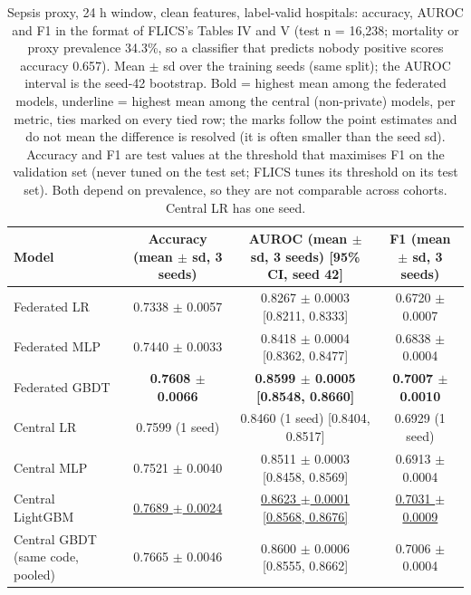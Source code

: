 \begin{table}[t]
\centering\small
\caption{Sepsis proxy, 24 h window, clean features, label-valid hospitals: accuracy, AUROC and F1 in the format of FLICS's Tables IV and V (test n = 16,238; mortality or proxy prevalence 34.3\%, so a classifier that predicts nobody positive scores accuracy 0.657). Mean $\pm$ sd over the training seeds (same split); the AUROC interval is the seed-42 bootstrap. Bold = highest mean among the federated models, underline = highest mean among the central (non-private) models, per metric, ties marked on every tied row; the marks follow the point estimates and do not mean the difference is resolved (it is often smaller than the seed sd). Accuracy and F1 are test values at the threshold that maximises F1 on the validation set (never tuned on the test set; FLICS tunes its threshold on its test set). Both depend on prevalence, so they are not comparable across cohorts. Central LR has one seed.}\label{tab:final_sepsis24}
\begin{tabular}{lccc}
\toprule
Model & Accuracy (mean $\pm$ sd, 3 seeds) & AUROC (mean $\pm$ sd, 3 seeds) [95\% CI, seed 42] & F1 (mean $\pm$ sd, 3 seeds) \\
\midrule
Federated LR & 0.7338 $\pm$ 0.0057 & 0.8267 $\pm$ 0.0003 [0.8211, 0.8333] & 0.6720 $\pm$ 0.0007 \\
Federated MLP & 0.7440 $\pm$ 0.0033 & 0.8418 $\pm$ 0.0004 [0.8362, 0.8477] & 0.6838 $\pm$ 0.0004 \\
Federated GBDT & \textbf{0.7608 $\pm$ 0.0066} & \textbf{0.8599 $\pm$ 0.0005 [0.8548, 0.8660]} & \textbf{0.7007 $\pm$ 0.0010} \\
Central LR & 0.7599 (1 seed) & 0.8460 (1 seed) [0.8404, 0.8517] & 0.6929 (1 seed) \\
Central MLP & 0.7521 $\pm$ 0.0040 & 0.8511 $\pm$ 0.0003 [0.8458, 0.8569] & 0.6913 $\pm$ 0.0004 \\
Central LightGBM & \underline{0.7689 $\pm$ 0.0024} & \underline{0.8623 $\pm$ 0.0001 [0.8568, 0.8676]} & \underline{0.7031 $\pm$ 0.0009} \\
Central GBDT (same code, pooled) & 0.7665 $\pm$ 0.0046 & 0.8600 $\pm$ 0.0006 [0.8555, 0.8662] & 0.7006 $\pm$ 0.0004 \\
\bottomrule
\end{tabular}
\end{table}

